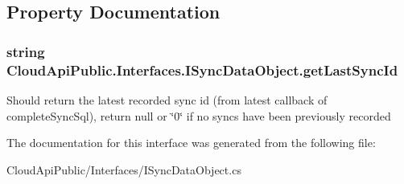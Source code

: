 \subsection{Property Documentation}
\hypertarget{interface_cloud_api_public_1_1_interfaces_1_1_i_sync_data_object_a1e0e4f15f93fce38eb008953eb1dd477}{
\subsubsection[{get\-Last\-Sync\-Id}]{\setlength{\rightskip}{0pt plus 5cm}string Cloud\-Api\-Public.\-Interfaces.\-I\-Sync\-Data\-Object.\-get\-Last\-Sync\-Id\hspace{0.3cm}{\ttfamily [get]}}}\label{interface_cloud_api_public_1_1_interfaces_1_1_i_sync_data_object_a1e0e4f15f93fce38eb008953eb1dd477}


Should return the latest recorded sync id (from latest callback of complete\-Sync\-Sql), return null or \char`\"{}0\char`\"{} if no syncs have been previously recorded 



The documentation for this interface was generated from the following file\-:\begin{DoxyCompactItemize}
\item 
Cloud\-Api\-Public/\-Interfaces/I\-Sync\-Data\-Object.\-cs\end{DoxyCompactItemize}
